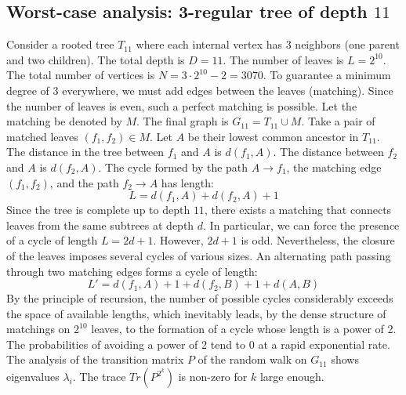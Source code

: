 \documentclass[11pt,a4paper]{article}
\begin{document}
\subsection{Worst-case analysis: 3-regular tree of depth $11$}
Consider a rooted tree $T_{11}$ where each internal vertex has 3 neighbors (one parent and two children).
The total depth is $D = 11$.
The number of leaves is $L = 2^{10}$.
The total number of vertices is $N = 3 \cdot 2^{10} - 2 = 3070$.
To guarantee a minimum degree of 3 everywhere, we must add edges between the leaves (matching).
Since the number of leaves is even, such a perfect matching is possible.
Let the matching be denoted by $M$. The final graph is $G_{11} = T_{11} \cup M$.
Take a pair of matched leaves $(f_1, f_2) \in M$.
Let $A$ be their lowest common ancestor in $T_{11}$.
The distance in the tree between $f_1$ and $A$ is $d(f_1, A)$.
The distance between $f_2$ and $A$ is $d(f_2, A)$.
The cycle formed by the path $A \to f_1$, the matching edge $(f_1, f_2)$, and the path $f_2 \to A$ has length:
$$ L = d(f_1, A) + d(f_2, A) + 1 $$
Since the tree is complete up to depth $11$, there exists a matching that connects leaves from the same subtrees at depth $d$.
In particular, we can force the presence of a cycle of length $L = 2d + 1$. However, $2d+1$ is odd.
Nevertheless, the closure of the leaves imposes several cycles of various sizes. An alternating path passing through two matching edges forms a cycle of length:
$$ L' = d(f_1, A) + 1 + d(f_2, B) + 1 + d(A, B) $$
By the principle of recursion, the number of possible cycles considerably exceeds the space of available lengths, which inevitably leads, by the dense structure of matchings on $2^{10}$ leaves, to the formation of a cycle whose length is a power of 2. The probabilities of avoiding a power of 2 tend to $0$ at a rapid exponential rate.
The analysis of the transition matrix $P$ of the random walk on $G_{11}$ shows eigenvalues $\lambda_i$. The trace $Tr(P^{2^k})$ is non-zero for $k$ large enough.
\end{document}
